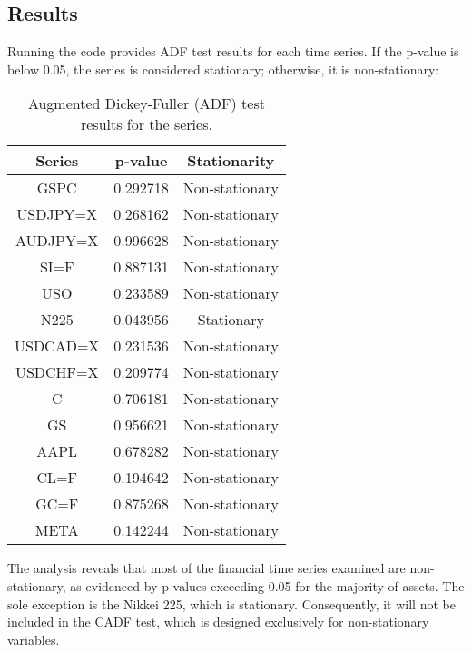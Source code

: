 \documentclass{article}
\begin{document}
\subsection*{Results}
Running the code provides ADF test results for each time series. If the p-value is below 0.05, the series is considered stationary; otherwise, it is non-stationary:
\begin{table}[h]
    \centering
    \begin{tabular}{|c|c|c|}
        \hline
        \textbf{Series} & \textbf{p-value} & \textbf{Stationarity} \\
        \hline
        GSPC & 0.292718 & Non-stationary \\
        \hline
        USDJPY=X & 0.268162 & Non-stationary \\
        \hline
        AUDJPY=X & 0.996628 & Non-stationary \\
        \hline
        SI=F & 0.887131 & Non-stationary \\
        \hline
        USO & 0.233589 & Non-stationary \\
        \hline
        N225 & 0.043956 & Stationary \\
        \hline
        USDCAD=X & 0.231536 & Non-stationary \\
        \hline
        USDCHF=X & 0.209774 & Non-stationary \\
        \hline
        C & 0.706181 & Non-stationary \\
        \hline
        GS & 0.956621 & Non-stationary \\
        \hline
        AAPL & 0.678282 & Non-stationary \\
        \hline
        CL=F & 0.194642 & Non-stationary \\
        \hline
        GC=F & 0.875268 & Non-stationary \\
        \hline
        META & 0.142244 & Non-stationary \\
        \hline
    \end{tabular}
    \caption{Augmented Dickey-Fuller (ADF) test results for the series.}
    \label{tab:ADF_results}
\end{table}
The analysis reveals that most of the financial time series examined are non-stationary, as evidenced by p-values exceeding 0.05 for the majority of assets. The sole exception is the Nikkei 225, which is stationary. Consequently, it will not be included in the CADF test, which is designed exclusively for non-stationary variables.
\clearpage
\end{document}
